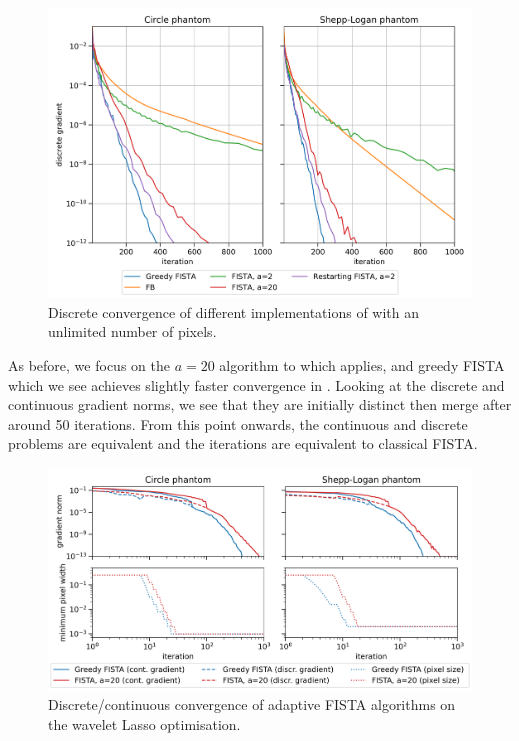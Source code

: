 \documentclass[10pt,a4paper,onecolumn]{article}
\numberwithin{equation}{section}
\begin{document}
\begin{figure}[H]\centering
	\includegraphics[width=.84\textwidth]{haar_convergence}
	\caption{Discrete convergence of different implementations of  with an unlimited number of pixels.}\label{fig:ca: haar convergence}
\end{figure}

As before, we focus on the $a=20$ algorithm to which  applies, and greedy FISTA which we see achieves slightly faster convergence in . Looking at the discrete and continuous gradient norms, we see that they are initially distinct then merge after around 50 iterations. From this point onwards, the continuous and discrete problems are equivalent and the iterations are equivalent to classical FISTA.

\begin{figure}\centering
	\includegraphics[width=.84\textwidth]{haar_reduced_convergence}
	\caption{Discrete/continuous convergence of adaptive FISTA algorithms on the wavelet Lasso optimisation.}\label{fig:ca: haar convergence zoom}
\end{figure}
\end{document}
